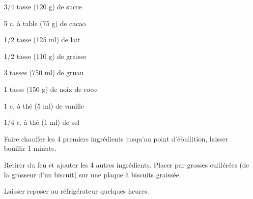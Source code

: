 


\totaltime{}


\begin{ingredients}
    \item 3/4 tasse (120 g) de sucre
    \item 5 c. à table (75 g) de cacao
    \item 1/2 tasse (125 ml) de lait
    \item 1/2 tasse (110 g) de graisse
    \item 3 tasses (750 ml) de gruau
    \item 1 tasse (150 g) de noix de coco
    \item 1 c. à thé (5 ml) de vanille
    \item 1/4 c. à thé (1 ml) de sel
\end{ingredients}

\begin{steps}
    \item Faire chauffer les 4 premiers ingrédients jusqu'au point d'ébullition, laisser bouillir 1 minute.
    \item Retirer du feu et ajouter les 4 autres ingrédients. Placer par grosses cuillérées (de la grosseur d'un biscuit) sur une plaque à biscuits graissée.
    \item Laisser reposer au réfrigérateur quelques heures.
\end{steps}
